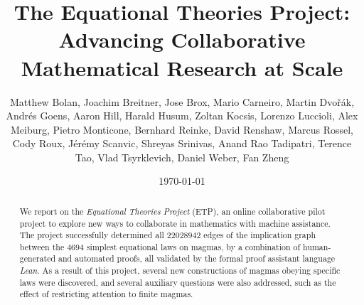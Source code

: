 \documentclass[12pt]{amsart}
\title[Equational Theories Project]{The Equational Theories Project: Advancing Collaborative Mathematical Research at Scale}
\author[Equational Theories Project contributors]{Matthew Bolan, Joachim Breitner, Jose Brox, Mario Carneiro,
  Martin Dvo\v{r}\'ak, Andr\'es Goens, Aaron Hill, Harald Husum, Zoltan Kocsis, Lorenzo Luccioli,
  Alex Meiburg, Pietro Monticone, Bernhard Reinke, David Renshaw, Marcus Rossel, Cody Roux,
  J\'er\'emy Scanvic, Shreyas Srinivas, Anand Rao Tadipatri, Terence Tao, Vlad Tsyrklevich,
  Daniel Weber, Fan Zheng}
\date{\today}
\theoremstyle{definition}
\begin{document}
\begin{abstract}
  We report on the \emph{Equational Theories Project} (ETP), an online collaborative pilot project
  to explore new ways to collaborate in mathematics with machine assistance. The project successfully determined all $\num{22028942}$ edges of the implication graph between the $4694$ simplest equational laws on magmas, by a combination of
  human-generated and automated proofs, all validated by the formal proof assistant language
  \emph{Lean}. As a result of this project, several new constructions of magmas obeying specific laws were discovered, and several auxiliary questions were also addressed, such as the effect of restricting attention to finite magmas.
\end{abstract}

\maketitle

\tableofcontents








% 






\appendix







\listoftodos{}
\end{document}
